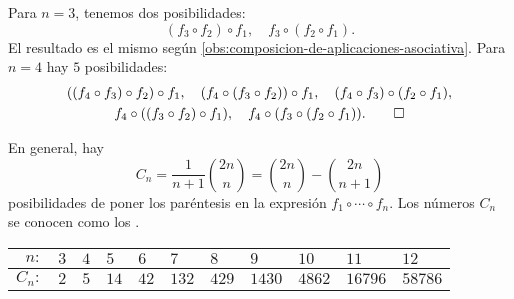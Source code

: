 \begin{ejemplo}
  Para $n = 3$, tenemos dos posibilidades:
  $$(f_3\circ f_2)\circ f_1, \quad f_3\circ (f_2\circ f_1).$$
  El resultado es el mismo según
  \ref{obs:composicion-de-aplicaciones-asociativa}. Para $n = 4$ hay $5$
  posibilidades:
  \begin{gather*}
    ((f_4\circ f_3)\circ f_2)\circ f_1, \quad (f_4\circ (f_3\circ f_2))\circ f_1, \quad (f_4\circ f_3)\circ (f_2\circ f_1), \\
    f_4\circ ((f_3\circ f_2)\circ f_1), \quad f_4\circ (f_3\circ (f_2\circ f_1)). \qedhere
  \end{gather*}
\end{ejemplo}

\begin{comentarioast}
  En general, hay
  $$C_n = \frac{1}{n+1} {2n \choose n} = {2n \choose n} - {2n \choose n+1}$$
  posibilidades de poner los paréntesis en la expresión $f_1\circ\cdots\circ f_n$. Los números $C_n$ se conocen como los .

  \begin{center}
    \begin{tabular}{rx{0.75cm}x{0.75cm}x{0.75cm}x{0.75cm}x{0.75cm}x{0.75cm}x{0.75cm}x{1cm}x{1cm}x{1cm}}
      \hline
      $n\colon$ & $3$ & $4$ & $5$ & $6$ & $7$ & $8$ & $9$ & $10$ & $11$ & $12$ \tabularnewline
      \hline
      $C_n\colon$ & $2$ & $5$ & $14$ & $42$ & $132$ & $429$ & $1430$ & $4862$ & $16796$ & $58786$ \tabularnewline
      \hline
    \end{tabular}
  \end{center}
\end{comentarioast}

